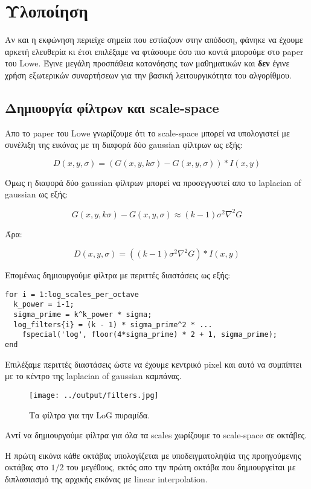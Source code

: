 \documentclass[11pt]{scrartcl} %
\begin{document}
\section{Υλοποίηση}
Αν και η εκφώνηση περιείχε σημεία που εστίαζουν στην απόδοση, φάνηκε να έχουμε αρκετή ελευθερία κι έτσι επιλέξαμε
να φτάσουμε όσο πιο κοντά μπορούμε στο paper του Lowe\cite{lowe}. Έγινε μεγάλη προσπάθεια κατανόησης των μαθηματικών και \textbf{δεν}
έγινε χρήση εξωτερικών συναρτήσεων για την βασική λειτουργικότητα του αλγορίθμου.

\subsection{Δημιουργία φίλτρων και scale-space}

Απο το paper του Lowe γνωρίζουμε ότι το scale-space μπορεί να υπολογιστεί με συνέλιξη της εικόνας με τη διαφορά δύο gaussian φίλτρων ως εξής:

\[D(x,y,\sigma) = (G(x,y,k\sigma) − G(x,y,\sigma)) * I(x,y)\]

Όμως η διαφορά δύο gaussian φίλτρων μπορεί να προσεγγυστεί απο το laplacian of gaussian ως εξής:

\[G(x,y,k\sigma) − G(x,y,\sigma) \approx (k−1)\sigma^2 \nabla^2 G\]

Άρα:

\[D(x,y,\sigma) = ((k−1)\sigma^2 \nabla^2 G) * I(x,y)\]

Επομένως δημιουργούμε φίλτρα με περιττές διαστάσεις ως εξής:

\begin{verbatim}
for i = 1:log_scales_per_octave
  k_power = i-1;
  sigma_prime = k^k_power * sigma;
  log_filters{i} = (k - 1) * sigma_prime^2 * ...
    fspecial('log', floor(4*sigma_prime) * 2 + 1, sigma_prime);
end
\end{verbatim}

Επιλέξαμε περιττές διαστάσεις ώστε να έχουμε κεντρικό pixel και αυτό να συμπίπτει με το κέντρο της laplacian of gaussian καμπάνας.

\begin{figure}[H]
  \centerline{\texttt{[image: ../output/filters.jpg]}}
  \caption{Τα φίλτρα για την LoG πυραμίδα.}
\end{figure}

Αντί να δημιουργούμε φίλτρα για όλα τα scales χωρίζουμε το scale-space σε οκτάβες.

Η πρώτη εικόνα κάθε οκτάβας υπολογίζεται με υποδειγματοληψία της προηγούμενης οκτάβας στο $1/2$ του μεγέθους, εκτός απο την πρώτη οκτάβα που δημιουργείται με διπλασιασμό της αρχικής εικόνας με linear interpolation.
\end{document}
